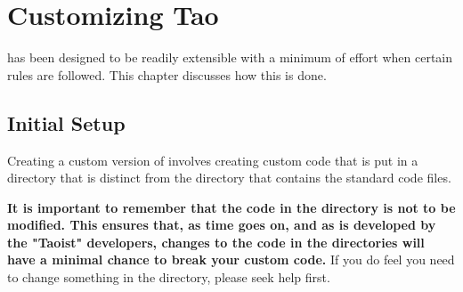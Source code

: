 \chapter{Customizing Tao}
\label{c:custom.tao}

\tao has been designed to be readily extensible with a minimum of
effort when certain rules are followed. 
This chapter discusses how this is done.

\section{Initial Setup}
\label{s:cust.init}

Creating a custom version of \tao involves creating custom code that is put in a directory that is
distinct from the  directory that contains the standard \tao code files.

\textbf{It is important to remember that the code in the  directory is not to be modified.
This ensures that, as time goes on, and as \tao is developed by the "Taoist" developers, changes to
the code in the  directories will have a minimal chance to break your custom code.} If you do
feel you need to change something in the  directory, please seek help first.

